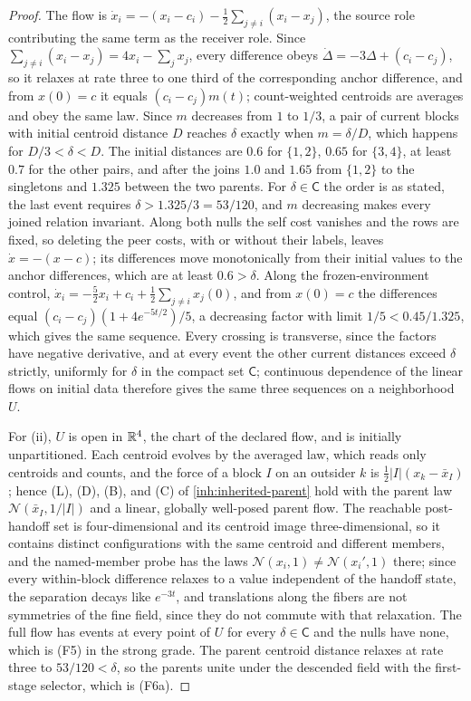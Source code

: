 \begin{proof}
The flow is $\dot x_i=-(x_i-c_i)-\tfrac12\sum_{j\neq i}(x_i-x_j)$, the source
role contributing the same term as the receiver role. Since
$\sum_{j\neq i}(x_i-x_j)=4x_i-\sum_jx_j$, every difference obeys
$\dot\Delta=-3\Delta+(c_i-c_j)$, so it relaxes at rate three to one third of
the corresponding anchor difference, and from $x(0)=c$ it equals
$(c_i-c_j)m(t)$; count-weighted centroids are averages and obey the same
law. Since $m$ decreases from $1$ to $1/3$, a pair of current blocks with
initial centroid distance $D$ reaches $\delta$ exactly when $m=\delta/D$,
which happens for $D/3<\delta<D$. The initial distances are $0.6$ for
$\{1,2\}$, $0.65$ for $\{3,4\}$, at least $0.7$ for the other pairs, and after
the joins $1.0$ and $1.65$ from $\{1,2\}$ to the singletons and $1.325$
between the two parents. For $\delta\in\mathsf C$ the order is as stated, the
last event requires $\delta>1.325/3=53/120$, and $m$ decreasing makes every
joined relation invariant. Along both nulls the self cost vanishes and the
rows are fixed, so deleting the peer costs, with or without their labels,
leaves $\dot x=-(x-c)$; its differences move monotonically from their initial
values to the anchor differences, which are at least $0.6>\delta$. Along the
frozen-environment control,
$\dot x_i=-\tfrac52x_i+c_i+\tfrac12\sum_{j\neq i}x_j(0)$, and from $x(0)=c$
the differences equal $(c_i-c_j)(1+4e^{-5t/2})/5$, a decreasing factor with
limit $1/5<0.45/1.325$, which gives the same sequence. Every crossing is
transverse, since the factors have negative derivative, and at every event
the other current distances exceed $\delta$ strictly, uniformly for $\delta$
in the compact set $\mathsf C$; continuous dependence of the linear flows on
initial data therefore gives the same three sequences on a neighborhood $U$.

For (ii), $U$ is open in $\mathbb R^4$, the chart of the declared flow, and is
initially unpartitioned. Each centroid evolves by the averaged law, which
reads only centroids and counts, and the force of a block $I$ on an outsider
$k$ is $\tfrac12|I|(x_k-\bar x_I)$; hence (L), (D), (B), and (C) of
\cref{inh:inherited-parent} hold with the parent law
$\mathcal N(\bar x_I,1/|I|)$ and a linear, globally well-posed parent flow.
The reachable post-handoff set is four-dimensional and its centroid image
three-dimensional, so it contains distinct configurations with the same
centroid and different members, and the named-member probe has the laws
$\mathcal N(x_i,1)\neq\mathcal N(x_i',1)$ there; since every within-block
difference relaxes to a value independent of the handoff state, the
separation decays like $e^{-3t}$, and translations along the fibers are not
symmetries of the fine field, since they do not commute with that
relaxation. The full flow has events at every point of $U$ for every
$\delta\in\mathsf C$ and the nulls have none, which is (F5) in the strong
grade. The parent centroid distance relaxes at rate three to
$53/120<\delta$, so the parents unite under the descended field with the
first-stage selector, which is (F6a).


\end{proof}
